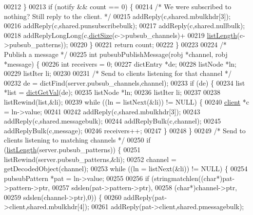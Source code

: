 \begin{DoxyCode}
00212     \}
00213     \textcolor{keywordflow}{if} (notify && count == 0) \{
00214         \textcolor{comment}{/* We were subscribed to nothing? Still reply to the client. */}
00215         addReply(c,shared.mbulkhdr[3]);
00216         addReply(c,shared.punsubscribebulk);
00217         addReply(c,shared.nullbulk);
00218         addReplyLongLong(c,\hyperlink{dict_8h_af193430dd3d5579a52b194512f72c1f0}{dictSize}(c->pubsub\_channels)+
00219                        \hyperlink{adlist_8h_afde0ab079f934670e82119b43120e94b}{listLength}(c->pubsub\_patterns));
00220     \}
00221     \textcolor{keywordflow}{return} count;
00222 \}
00223 
00224 \textcolor{comment}{/* Publish a message */}
00225 \textcolor{keywordtype}{int} pubsubPublishMessage(robj *channel, robj *message) \{
00226     \textcolor{keywordtype}{int} receivers = 0;
00227     dictEntry *de;
00228     listNode *ln;
00229     listIter li;
00230 
00231     \textcolor{comment}{/* Send to clients listening for that channel */}
00232     de = dictFind(server.pubsub\_channels,channel);
00233     \textcolor{keywordflow}{if} (de) \{
00234         list *list = \hyperlink{dict_8h_ae8d2cc391873b2bea2b87c4f80f43120}{dictGetVal}(de);
00235         listNode *ln;
00236         listIter li;
00237 
00238         listRewind(list,&li);
00239         \textcolor{keywordflow}{while} ((ln = listNext(&li)) != NULL) \{
00240             \hyperlink{structclient}{client} *c = ln->value;
00241 
00242             addReply(c,shared.mbulkhdr[3]);
00243             addReply(c,shared.messagebulk);
00244             addReplyBulk(c,channel);
00245             addReplyBulk(c,message);
00246             receivers++;
00247         \}
00248     \}
00249     \textcolor{comment}{/* Send to clients listening to matching channels */}
00250     \textcolor{keywordflow}{if} (\hyperlink{adlist_8h_afde0ab079f934670e82119b43120e94b}{listLength}(server.pubsub\_patterns)) \{
00251         listRewind(server.pubsub\_patterns,&li);
00252         channel = getDecodedObject(channel);
00253         \textcolor{keywordflow}{while} ((ln = listNext(&li)) != NULL) \{
00254             pubsubPattern *pat = ln->value;
00255 
00256             \textcolor{keywordflow}{if} (stringmatchlen((\textcolor{keywordtype}{char}*)pat->pattern->ptr,
00257                                 sdslen(pat->pattern->ptr),
00258                                 (\textcolor{keywordtype}{char}*)channel->ptr,
00259                                 sdslen(channel->ptr),0)) \{
00260                 addReply(pat->client,shared.mbulkhdr[4]);
00261                 addReply(pat->client,shared.pmessagebulk);

\end{DoxyCode}
